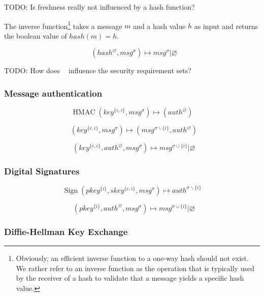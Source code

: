 \documentclass[a4paper]{article}
\DeclareMathOperator{\hashvrfy}{Verify_{Hash}}
\DeclareMathOperator{\hmac}{HMAC}
\DeclareMathOperator{\hmacinline}{HMAC_{Inline}}
\DeclareMathOperator{\hmacvrfy}{Verify_{HMAC}}
\DeclareMathOperator{\sign}{Sign}
\DeclareMathOperator{\signvrfy}{Verify_{Sig}}
\newcommand{\TODO}[1]{\small\noindent\color{red} TODO: #1\color{black}}
\newcommand{\emptysec}{\varnothing}
\newcommand{\secminus}{\smallsetminus}
\begin{document}
\TODO{Is freshness really not influenced by a hash function?}

The inverse function\footnote{Obviously, an efficient inverse function to a
one-way hash should not exist. We rather refer to an inverse function as the
operation that is typically used by the receiver of a hash to validate that a
message yields a specific hash value.} takes a message $m$ and a hash
value $h$ as input and returns the boolean value of $hash(m) = h$.

$$\hashvrfy(hash^\emptysec, msg^\sigma) \mapsto msg^{\sigma} | \emptysec$$

\TODO{How does $\hashvrfy$ influence the security requirement sets?}

\subsubsection{Message authentication}

$$\hmac(key^{\{c,i\}}, msg^\sigma) \mapsto (auth^{\emptysec})$$

$$\hmacinline(key^{\{c,i\}}, msg^\sigma) \mapsto (msg^{\sigma\secminus{\{i\}}}, auth^{\emptysec})$$

$$\hmacvrfy(key^{\{c,i\}}, auth^\emptysec, msg^\sigma) \mapsto msg^{\sigma\cup\{i\}} | \emptysec$$

%

\subsubsection{Digital Signatures}

$$\sign(pkey^{\{i\}}, skey^{\{c,i\}}, msg^\sigma) \mapsto auth^{\sigma\secminus\{i\}}$$

$$\signvrfy(pkey^{\{i\}}, auth^{\emptysec}, msg^\sigma) \mapsto msg^{\sigma\cup\{i\}} | \emptysec$$

\subsubsection{Diffie-Hellman Key Exchange}
\end{document}
